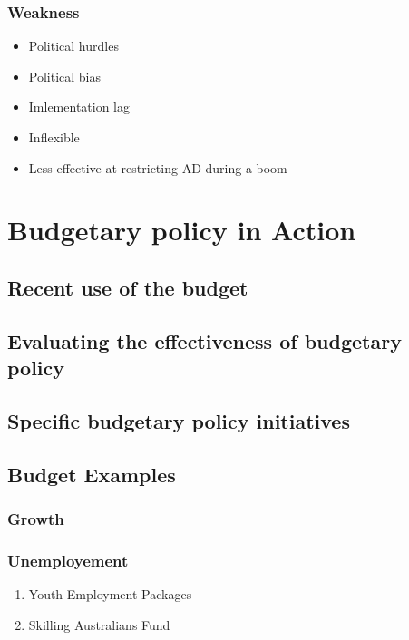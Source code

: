\documentclass[11pt]{article}
\begin{document}
\subsubsection{Weakness}
\label{sec-1-12-2}
\begin{itemize}
\item Political hurdles
\item Political bias
\item Imlementation lag
\item Inflexible
\item Less effective at restricting AD during a boom
\end{itemize}



\section{Budgetary policy in Action}
\label{sec-2}

\subsection{Recent use of the budget}
\label{sec-2-1}

\subsection{Evaluating the effectiveness of budgetary policy}
\label{sec-2-2}

\subsection{Specific budgetary policy initiatives}
\label{sec-2-3}


\subsection{Budget Examples}
\label{sec-2-4}

\subsubsection{Growth}
\label{sec-2-4-1}

\subsubsection{Unemployement}
\label{sec-2-4-2}

\begin{enumerate}
\item Youth Employment Packages
\label{sec-2-4-2-1}

\item Skilling Australians Fund
\label{sec-2-4-2-2}
\end{enumerate}
\end{document}
